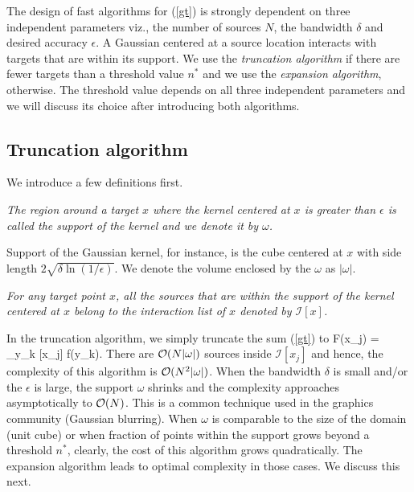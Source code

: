 
The design of fast algorithms for (\ref{gt}) is strongly dependent on three independent parameters viz., the number of sources $N$, the bandwidth $\delta$ and desired accuracy $\epsilon$. A Gaussian centered at a source location interacts with targets that are within its support. We use the {\em truncation algorithm} if there are fewer targets than a threshold value $n^*$ and we use the {\em expansion algorithm}, otherwise. The threshold value depends on all three independent parameters and we will discuss its choice after introducing both algorithms. 

\subsection{Truncation algorithm} 
We introduce a few definitions first.
\begin{mydef} {\em The region around a target $x$ where the kernel centered at $x$ is greater than $\epsilon$ is called the support of the kernel and we denote it by $\omega$.}
\end{mydef}

Support of the Gaussian kernel, for instance, is the cube centered at $x$ with side length $2 \sqrt{\delta \ln (1/\epsilon)}$. We denote the volume enclosed by the $\omega$ as $|\omega|$.

\begin{mydef} {\em For any target point $x$, all the sources that are within the support of the kernel centered at $x$ belong to the interaction list of $x$ denoted by $\mathcal{I}[x]$.}
\end{mydef}
In the truncation algorithm, we simply truncate the sum (\ref{gt}) to
%
\beq F(x_j) = \sum_{y_k \in {}[x_j]}  f(y_k). \label{eqn:truncation} \eeq
%
There are $\mathcal{O}(N |\omega|)$ sources inside $\mathcal{I}[x_j]$ and hence, the complexity of this algorithm is $\mathcal{O}(N^2 |\omega|)$. When the bandwidth $\delta$ is small and/or the $\epsilon$ is large, the support $\omega$ shrinks and the complexity approaches asymptotically to $\mathcal{O}(N)$. This is a common technique used in the graphics community (Gaussian blurring). When $\omega$ is comparable to the size of the domain (unit cube) or when fraction of points within the support grows beyond a threshold $n^*$, clearly, the cost of this algorithm grows quadratically. The expansion algorithm leads to optimal complexity in those cases. We discuss this next.

